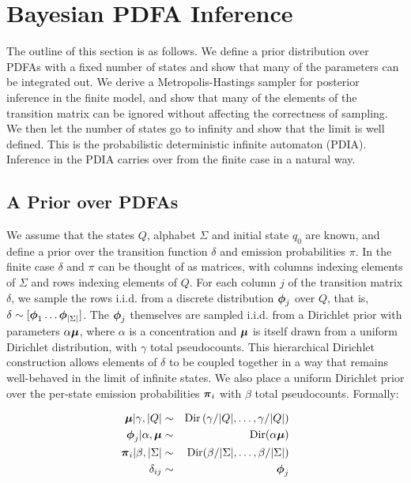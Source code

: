 \section{Bayesian PDFA Inference}

The outline of this section is as follows.  We define a prior distribution over PDFAs with a fixed number of states and show that many of the parameters can be integrated out.  We derive a Metropolis-Hastings sampler for posterior inference in the finite model, and show that many of the elements of the transition matrix can be ignored without affecting the correctness of sampling.  We then let the number of states go to infinity and show that the limit is well defined.  This is the probabilistic deterministic infinite automaton (PDIA).  Inference in the PDIA carries over from the finite case in a natural way.

\subsection{A Prior over PDFAs}

We assume that the states $Q$, alphabet $\Sigma$ and initial state $q_0$ are known, and define a prior over the transition function $\delta$ and emission probabilities $\pi$.  In the finite case $\delta$ and $\pi$ can be thought of as matrices, with columns indexing elements of $\Sigma$ and rows indexing elements of $Q$.  For each column $j$ of the transition matrix $\delta$, we sample the rows i.i.d. from a discrete distribution $\bphi_j$ over $Q$, that is, $\delta \sim [\bphi_1\ldots\bphi_{|\Sigma|}]$.  The $\bphi_j$ themselves are sampled i.i.d. from a Dirichlet prior with parameters $\alpha\bmu$, where $\alpha$ is a concentration and $\bmu$ is itself drawn from a uniform Dirichlet distribution, with $\gamma$ total pseudocounts.  This hierarchical Dirichlet construction allows elements of $\delta$ to be coupled together in a way that remains well-behaved in the limit of infinite states.  We also place a uniform Dirichlet prior over the per-state emission probabilities $\bpi_i$ with $\beta$ total pseudocounts.  Formally:

\begin{eqnarray}
\bmu|\gamma,|Q| & \sim & \mathrm{Dir}\left(\gamma/|Q|,\ldots,\gamma/|Q|\right) \label{gen:mu} \\
\bphi_{j}|\alpha,\bmu  & \sim & \mathrm{Dir}(\alpha\bmu) \label{gen:phi} \\
\bpi_{i}|\beta,|\Sigma| & \sim & \mathrm{Dir}(\beta/|\Sigma|,\ldots,\beta/|\Sigma|) \label{gen:pi}\\
\delta_{ij} & \sim & \bphi_{j} \label{gen:delta}
\end{eqnarray}

